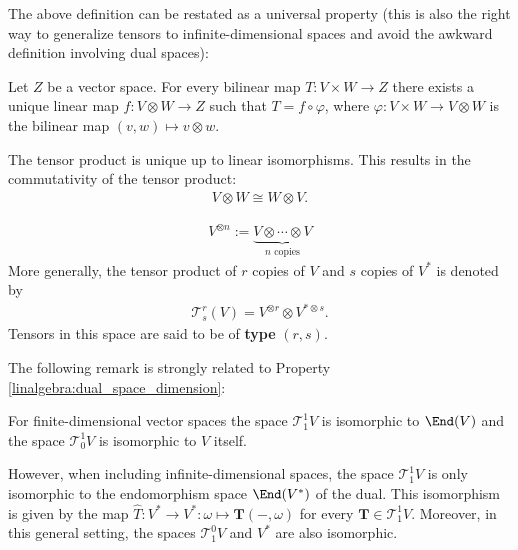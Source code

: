     The above definition can be restated as a universal property (this is also the right way to generalize tensors to infinite-dimensional spaces and avoid the awkward definition involving dual spaces):
    \begin{uproperty}\label{vector:universal_property}
        Let $Z$ be a vector space. For every bilinear map $T:V\times W\rightarrow Z$ there exists a unique linear map $f:V\otimes W\rightarrow Z$ such that $T = f\circ\varphi$, where $\varphi:V\times W\rightarrow V\otimes W$ is the bilinear map $(v,w)\mapsto v\otimes w$.
    \end{uproperty}
    \begin{result}
        The tensor product is unique up to linear isomorphisms. This results in the commutativity of the tensor product:
        \begin{gather}
           \label{vector:commutativity}
            V\otimes W \cong W\otimes V.
        \end{gather}
    \end{result}

    \begin{notation}\label{vector:type}
        \begin{gather}
            V^{\otimes n} := \underbrace{V\otimes\cdots\otimes V}_{n\text{ copies}}
        \end{gather}
        More generally, the tensor product of $r$ copies of $V$ and $s$ copies of $V^*$ is denoted by
        \begin{gather}
            \mathcal{T}^r_s(V) = V^{\otimes r}\otimes V^{*\otimes s}.
        \end{gather}
        Tensors in this space are said to be of \textbf{type} $(r,s)$.
    \end{notation}

    The following remark is strongly related to Property \ref{linalgebra:dual_space_dimension}:
    \begin{remark}
        For finite-dimensional vector spaces the space $\mathcal{T}^1_1V$ is isomorphic to $\End(V)$ and the space $\mathcal{T}^1_0V$ is isomorphic to $V$ itself.

        However, when including infinite-dimensional spaces, the space $\mathcal{T}^1_1V$ is only isomorphic to the endomorphism space $\End(V^*)$ of the dual. This isomorphism is given by the map $\hat{T}:V^*\rightarrow V^*:\omega\mapsto\mathbf{T}(-,\omega)$ for every $\mathbf{T}\in\mathcal{T}^1_1V$. Moreover, in this general setting, the spaces $\mathcal{T}^0_1V$ and $V^*$ are also isomorphic.
    \end{remark}

